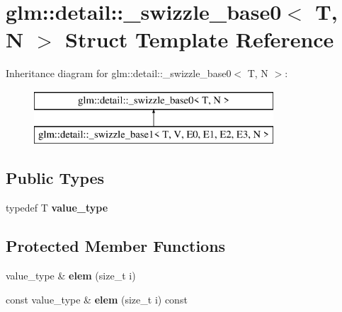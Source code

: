 \hypertarget{structglm_1_1detail_1_1__swizzle__base0}{\section{glm\-:\-:detail\-:\-:\-\_\-swizzle\-\_\-base0$<$ T, N $>$ Struct Template Reference}
\label{structglm_1_1detail_1_1__swizzle__base0}
}
Inheritance diagram for glm\-:\-:detail\-:\-:\-\_\-swizzle\-\_\-base0$<$ T, N $>$\-:\begin{figure}[H]
\begin{center}
\leavevmode
\includegraphics[height=2.000000cm]{structglm_1_1detail_1_1__swizzle__base0}
\end{center}
\end{figure}
\subsection*{Public Types}
\begin{DoxyCompactItemize}
\item 
\hypertarget{structglm_1_1detail_1_1__swizzle__base0_ad38a739e1fe6d2db2674f34c98159c8f}{typedef T {\bfseries value\-\_\-type}}\label{structglm_1_1detail_1_1__swizzle__base0_ad38a739e1fe6d2db2674f34c98159c8f}

\end{DoxyCompactItemize}
\subsection*{Protected Member Functions}
\begin{DoxyCompactItemize}
\item 
\hypertarget{structglm_1_1detail_1_1__swizzle__base0_a88f08b952f849e69011cb9242d809738}{value\-\_\-type \& {\bfseries elem} (size\-\_\-t i)}\label{structglm_1_1detail_1_1__swizzle__base0_a88f08b952f849e69011cb9242d809738}

\item 
\hypertarget{structglm_1_1detail_1_1__swizzle__base0_aa091a75b3fbc0dd70f49f65225002e2a}{const value\-\_\-type \& {\bfseries elem} (size\-\_\-t i) const }\label{structglm_1_1detail_1_1__swizzle__base0_aa091a75b3fbc0dd70f49f65225002e2a}

\end{DoxyCompactItemize}
